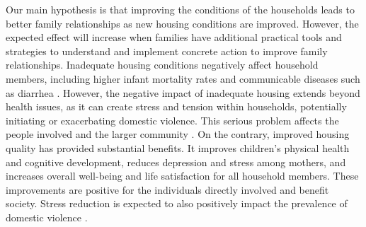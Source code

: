         Our main hypothesis is that improving the conditions of the households leads to better family relationships as new housing conditions are improved. However, the expected effect will increase when families have additional practical tools and strategies to understand and implement concrete action to improve family relationships. Inadequate housing conditions negatively affect household members, including higher infant mortality rates and communicable diseases such as diarrhea \cite{sclar200521st}. However, the negative impact of inadequate housing extends beyond health issues, as it can create stress and tension within households, potentially initiating or exacerbating domestic violence. This serious problem affects the people involved and the larger community \cite{devoto2012happiness}. On the contrary, improved housing quality has provided substantial benefits. It improves children's physical health and cognitive development, reduces depression and stress among mothers, and increases overall well-being and life satisfaction for all household members. These improvements are positive for the individuals directly involved and benefit society. Stress reduction is expected to also positively impact the prevalence of domestic violence \cite{cattaneo2009housing,devoto2012happiness,galiani2017shelter}.
        
